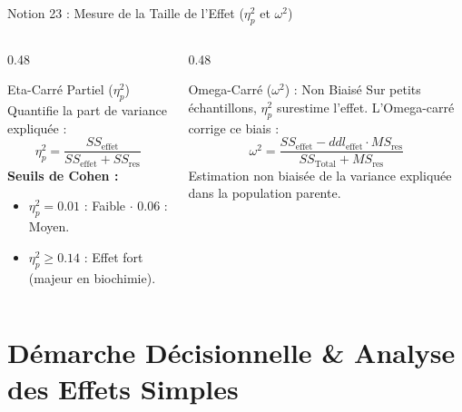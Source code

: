 \documentclass[aspectratio=169,10pt]{beamer}
\begin{document}
\begin{frame}{Notion 23 : Mesure de la Taille de l'Effet ($\eta_p^2$ et $\omega^2$)}
  \begin{columns}[onlytextwidth, T]
    \begin{column}{0.48\linewidth}
      \begin{conceptbox}{Eta-Carré Partiel ($\eta_p^2$)}
        \small
        Quantifie la part de variance expliquée :
        \begin{equation*}
          \eta_p^2 = \frac{SS_{\text{effet}}}{SS_{\text{effet}} + SS_{\text{res}}}
        \end{equation*}
        \textbf{Seuils de Cohen :}
        \begin{itemize}
          \item $\eta_p^2 = 0.01$ : Faible $\cdot$ $0.06$ : Moyen.
          \item $\eta_p^2 \ge 0.14$ : Effet fort (majeur en biochimie).
        \end{itemize}
      \end{conceptbox}
    \end{column}
    \begin{column}{0.48\linewidth}
      \begin{takeawaybox}{Omega-Carré ($\omega^2$) : Non Biaisé}
        \small
        Sur petits échantillons, $\eta_p^2$ surestime l'effet. L'Omega-carré corrige ce biais :
        \begin{equation*}
          \omega^2 = \frac{SS_{\text{effet}} - ddl_{\text{effet}} \cdot MS_{\text{res}}}{SS_{\text{Total}} + MS_{\text{res}}}
        \end{equation*}
        Estimation non biaisée de la variance expliquée dans la population parente.
      \end{takeawaybox}
    \end{column}
  \end{columns}
\end{frame}

\section{Démarche Décisionnelle \& Analyse des Effets Simples}
\end{document}
